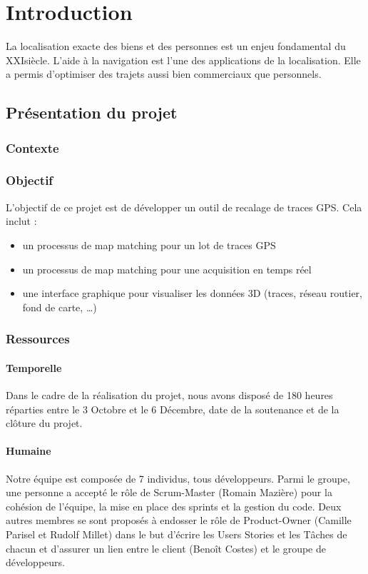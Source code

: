\chapter{Introduction}
La localisation exacte des biens et des personnes est un enjeu fondamental du XXI\ieme siècle. L'aide à la navigation est l'une des applications de la localisation. Elle a permis d'optimiser des trajets aussi bien commerciaux que personnels.
\section{Présentation du projet}
\subsection{Contexte}

\subsection{Objectif}
L'objectif de ce projet est de développer un outil de recalage de traces GPS. Cela inclut :
\begin{itemize}
\item{} un processus de map matching pour un lot de traces GPS
\item{} un processus de map matching pour une acquisition en temps réel
\item{} une interface graphique pour visualiser les données 3D (traces, réseau routier, fond de carte, \dots)
\end{itemize}
\subsection{Ressources}
\subsubsection{Temporelle}
Dans le cadre de la réalisation du projet, nous avons disposé de 180 heures réparties entre le 3 Octobre et le 6 Décembre, date de la soutenance et de la clôture du projet.
\subsubsection{Humaine}
Notre équipe est composée de 7 individus, tous développeurs. Parmi le groupe, une personne a accepté le rôle de Scrum-Master (Romain Mazière) pour la cohésion de l'équipe, la mise en place des sprints et la gestion du code. Deux autres membres se sont proposés à endosser le rôle de Product-Owner (Camille Parisel et Rudolf Millet) dans le but d'écrire les Users Stories et les Tâches de chacun et d'assurer un lien entre le client (Benoît Costes) et le groupe de développeurs.
